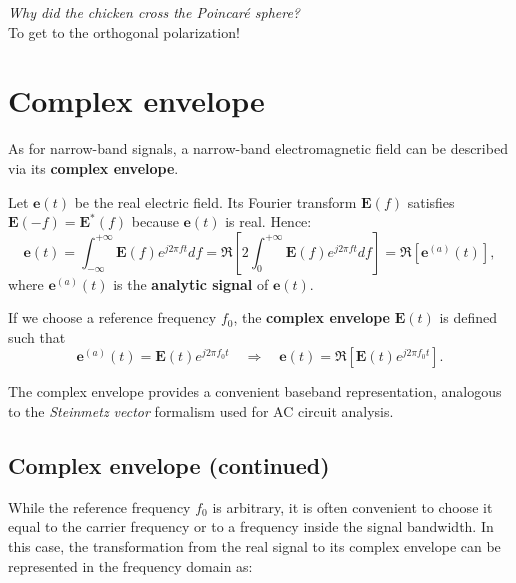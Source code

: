 \begin{center}
    \textit{Why did the chicken cross the Poincaré sphere?}\\[2pt]
    To get to the orthogonal polarization! 🐣
\end{center}

\section{Complex envelope}

As for narrow-band signals, a narrow-band electromagnetic field can be described via its \textbf{complex envelope}.

Let $\mathbf{e}(t)$ be the real electric field.  
Its Fourier transform $\mathbf{E}(f)$ satisfies $\mathbf{E}(-f) = \mathbf{E}^*(f)$ because $\mathbf{e}(t)$ is real.  
Hence:
\begin{equation}
    \mathbf{e}(t)
    = \int_{-\infty}^{+\infty} \mathbf{E}(f)e^{j2\pi f t}df
    = \Re\!\left[2\int_0^{+\infty}\mathbf{E}(f)e^{j2\pi f t}df\right]
    = \Re\!\left[\mathbf{e}^{(a)}(t)\right],
\end{equation}
where $\mathbf{e}^{(a)}(t)$ is the \textbf{analytic signal} of $\mathbf{e}(t)$.

If we choose a reference frequency $f_0$, the \textbf{complex envelope} $\mathbf{E}(t)$ is defined such that
\begin{equation}
    \mathbf{e}^{(a)}(t) = \mathbf{E}(t)e^{j2\pi f_0 t}
    \quad\Rightarrow\quad
    \mathbf{e}(t) = \Re\!\left[\mathbf{E}(t)e^{j2\pi f_0 t}\right].
\end{equation}

The complex envelope provides a convenient baseband representation, analogous to the \emph{Steinmetz vector} formalism used for AC circuit analysis.



\subsection*{Complex envelope (continued)}

While the reference frequency $f_0$ is arbitrary, it is often convenient to choose it equal to the carrier frequency or to a frequency inside the signal bandwidth.  
In this case, the transformation from the real signal to its complex envelope can be represented in the frequency domain as:

